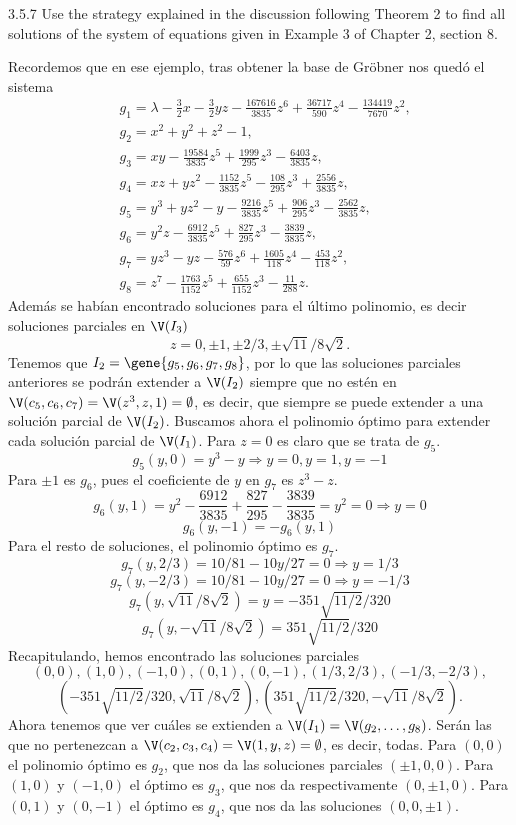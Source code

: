 \documentclass[twoside]{article}
\begin{document}
\begin{ejercicio}{3.5.7}
Use the strategy explained in the discussion following Theorem 2 to find all solutions of the system of equations given in Example 3 of Chapter 2, section 8.
\end{ejercicio}
\begin{solucion}
Recordemos que en ese ejemplo, tras obtener la base de Gröbner nos quedó el sistema
\begin{align*}
&g_1=λ − \frac{3}{2}x − \frac{3}{2}yz − \frac{167616}{3835}z^6 +\frac{36717}{590}z^4 − \frac{134419}{7670}z^2,\\
&g_2=x^2 + y^2 + z^2 − 1,\\
&g_3=xy − \frac{19584}{3835}z^5 +\frac{1999}{295}z^3 − \frac{6403}{3835}z,\\
&g_4=xz + yz^2 − \frac{1152}{3835}z^5 − \frac{108}{295}z^3 +\frac{2556}{3835}z,\\
&g_5=y^3 + yz^2 − y − \frac{9216}{3835}z^5 +\frac{906}{295}z^3 − \frac{2562}{3835}z,\\
&g_6=y^2z − \frac{6912}{3835}z^5 +\frac{827}{295}z^3 − \frac{3839}{3835}z,\\
&g_7=yz^3 − yz − \frac{576}{59}z^6 +\frac{1605}{118}z^4 − \frac{453}{118}z^2,\\
&g_8=z^7 − \frac{1763}{1152}z^5 +\frac{655}{1152}z^3 − \frac{11}{288}z.
\end{align*}
Además se habían encontrado soluciones para el último polinomio, es decir soluciones parciales en $\V(I_3)$
\[
z = 0, ±1, ±2/3, ±\sqrt{11}/8\sqrt{2}.
\]
Tenemos que $I_2=\gene{g_5,g_6,g_7,g_8}$, por lo que las soluciones parciales anteriores se podrán extender a $\V(I_2)$ siempre que no estén en $\V(c_5,c_6,c_7)=\V(z^3,z,1)=\emptyset$, es decir, que siempre se puede extender a una solución parcial de $\V(I_2)$. Buscamos ahora el polinomio óptimo para extender cada solución parcial de $\V(I_1)$. Para $z=0$ es claro que se trata de $g_5$.
\[
g_5(y,0)=y^3-y\Rightarrow y=0,y=1,y=-1
\]
Para $\pm 1$ es $g_6$, pues el coeficiente de $y$ en $g_7$ es $z^3-z$.
\[
g_6(y,1)=y^2 − \frac{6912}{3835} +\frac{827}{295} − \frac{3839}{3835}=y^2=0\Rightarrow y=0
\]
\[
g_6(y,-1)=-g_6(y,1)
\]
Para el resto de soluciones, el polinomio óptimo es $g_7$. 
\[
g_7(y,2/3)=10/81 - 10y/27=0\Rightarrow y=1/3
\]
\[
g_7(y,-2/3)=10/81 - 10y/27=0\Rightarrow y=-1/3
\]
\[
g_7(y,\sqrt{11}/8\sqrt{2})=y = -351 \sqrt{11/2}/320
\]
\[
g_7(y,-\sqrt{11}/8\sqrt{2})=351 \sqrt{11/2}/320
\]
Recapitulando, hemos encontrado las soluciones parciales
\[
(0,0), (1,0), (-1,0), (0,1), (0,-1), (1/3,2/3), (-1/3,-2/3), 
\]
\[
(-351 \sqrt{11/2}/320,\sqrt{11}/8\sqrt{2}), (351 \sqrt{11/2}/320,-\sqrt{11}/8\sqrt{2}).
\]
Ahora tenemos que ver cuáles se extienden a $\V(I_1)=\V(g_2,\dots, g_8)$. Serán las que no pertenezcan a $\V(c_2, c_3,c_4)=\V(1,y,z)=\emptyset$, es decir, todas. Para $(0,0)$ el polinomio óptimo es $g_2$, que nos da las soluciones parciales $(\pm 1,0,0)$. Para $(1,0)$ y $(-1,0)$ el óptimo es $g_3$, que nos da  respectivamente $(0,\pm 1, 0)$. Para $(0,1)$ y $(0,-1)$ el óptimo es $g_4$, que nos da las soluciones $(0,0,\pm 1)$. 


\end{solucion}
\end{document}
